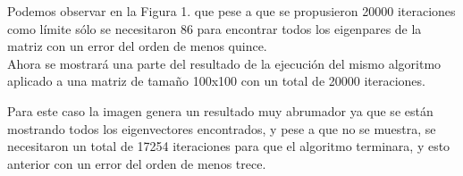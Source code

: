 \documentclass[12pt]{article}
\begin{document}
\begin{figure}[H]
	\centering
	\hfill
\end{figure}

Podemos observar en la Figura 1. que pese a que se propusieron 20000 iteraciones como límite sólo se necesitaron 86 para encontrar todos los eigenpares de la matriz con un error del orden de menos quince.\\
Ahora se mostrará una parte del resultado de la ejecución del mismo algoritmo aplicado a una matriz de tamaño 100x100 con un total de 20000 iteraciones.\\

\begin{figure}[H]
	\centering
	\hfill
\end{figure}

Para este caso la imagen genera un resultado muy abrumador ya que se están mostrando todos los eigenvectores encontrados, y pese a que no se muestra, se necesitaron un total de 17254 iteraciones para que el algoritmo terminara, y esto anterior con un error del orden de menos trece.
\end{document}
